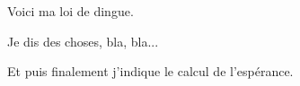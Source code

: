 Voici ma loi de dingue.


Je dis des choses, bla, bla...

Et puis finalement j'indique le calcul de l'espérance.

\calcexpval[disp  = exp,
            reuse = maloidedingue]{}